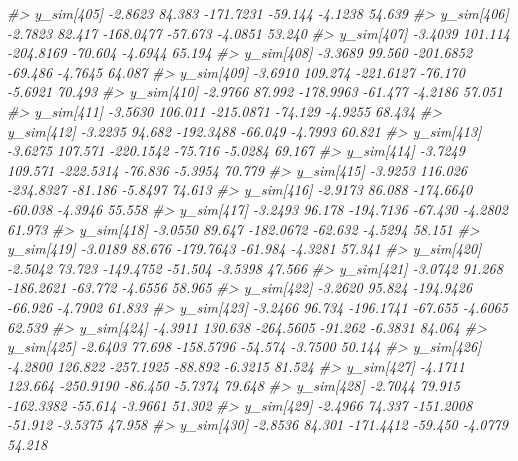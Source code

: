 \documentclass[
  10pt,
  italian,
  a4paper,
  extrafontsizes,onecolumn,openright
  ]{memoir}
\newenvironment{Shaded}{\begin{snugshade}}{\end{snugshade}}
\newcommand{\CommentTok}[1]{\textcolor[rgb]{0.56,0.35,0.01}{\textit{#1}}}
\begin{document}
\begin{Shaded}
\begin{Highlighting}[]
\CommentTok{\#\textgreater{}   y\_sim[405] {-}2.8623  84.383 {-}171.7231 {-}59.144 {-}4.1238 54.639}
\CommentTok{\#\textgreater{}   y\_sim[406] {-}2.7823  82.417 {-}168.0477 {-}57.673 {-}4.0851 53.240}
\CommentTok{\#\textgreater{}   y\_sim[407] {-}3.4039 101.114 {-}204.8169 {-}70.604 {-}4.6944 65.194}
\CommentTok{\#\textgreater{}   y\_sim[408] {-}3.3689  99.560 {-}201.6852 {-}69.486 {-}4.7645 64.087}
\CommentTok{\#\textgreater{}   y\_sim[409] {-}3.6910 109.274 {-}221.6127 {-}76.170 {-}5.6921 70.493}
\CommentTok{\#\textgreater{}   y\_sim[410] {-}2.9766  87.992 {-}178.9963 {-}61.477 {-}4.2186 57.051}
\CommentTok{\#\textgreater{}   y\_sim[411] {-}3.5630 106.011 {-}215.0871 {-}74.129 {-}4.9255 68.434}
\CommentTok{\#\textgreater{}   y\_sim[412] {-}3.2235  94.682 {-}192.3488 {-}66.049 {-}4.7993 60.821}
\CommentTok{\#\textgreater{}   y\_sim[413] {-}3.6275 107.571 {-}220.1542 {-}75.716 {-}5.0284 69.167}
\CommentTok{\#\textgreater{}   y\_sim[414] {-}3.7249 109.571 {-}222.5314 {-}76.836 {-}5.3954 70.779}
\CommentTok{\#\textgreater{}   y\_sim[415] {-}3.9253 116.026 {-}234.8327 {-}81.186 {-}5.8497 74.613}
\CommentTok{\#\textgreater{}   y\_sim[416] {-}2.9173  86.088 {-}174.6640 {-}60.038 {-}4.3946 55.558}
\CommentTok{\#\textgreater{}   y\_sim[417] {-}3.2493  96.178 {-}194.7136 {-}67.430 {-}4.2802 61.973}
\CommentTok{\#\textgreater{}   y\_sim[418] {-}3.0550  89.647 {-}182.0672 {-}62.632 {-}4.5294 58.151}
\CommentTok{\#\textgreater{}   y\_sim[419] {-}3.0189  88.676 {-}179.7643 {-}61.984 {-}4.3281 57.341}
\CommentTok{\#\textgreater{}   y\_sim[420] {-}2.5042  73.723 {-}149.4752 {-}51.504 {-}3.5398 47.566}
\CommentTok{\#\textgreater{}   y\_sim[421] {-}3.0742  91.268 {-}186.2621 {-}63.772 {-}4.6556 58.965}
\CommentTok{\#\textgreater{}   y\_sim[422] {-}3.2620  95.824 {-}194.9426 {-}66.926 {-}4.7902 61.833}
\CommentTok{\#\textgreater{}   y\_sim[423] {-}3.2466  96.734 {-}196.1741 {-}67.655 {-}4.6065 62.539}
\CommentTok{\#\textgreater{}   y\_sim[424] {-}4.3911 130.638 {-}264.5605 {-}91.262 {-}6.3831 84.064}
\CommentTok{\#\textgreater{}   y\_sim[425] {-}2.6403  77.698 {-}158.5796 {-}54.574 {-}3.7500 50.144}
\CommentTok{\#\textgreater{}   y\_sim[426] {-}4.2800 126.822 {-}257.1925 {-}88.892 {-}6.3215 81.524}
\CommentTok{\#\textgreater{}   y\_sim[427] {-}4.1711 123.664 {-}250.9190 {-}86.450 {-}5.7374 79.648}
\CommentTok{\#\textgreater{}   y\_sim[428] {-}2.7044  79.915 {-}162.3382 {-}55.614 {-}3.9661 51.302}
\CommentTok{\#\textgreater{}   y\_sim[429] {-}2.4966  74.337 {-}151.2008 {-}51.912 {-}3.5375 47.958}
\CommentTok{\#\textgreater{}   y\_sim[430] {-}2.8536  84.301 {-}171.4412 {-}59.450 {-}4.0779 54.218}

\end{Highlighting}
\end{Shaded}
\end{document}
